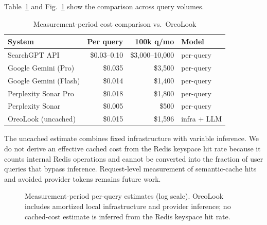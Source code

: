 \documentclass[conference]{IEEEtran}
\begin{document}
Table~\ref{tab:cost} and Fig.~\ref{fig:cost} show the comparison across query volumes.

\begin{table}[h]
\centering
\caption{Measurement-period cost comparison vs.\ OreoLook}
\label{tab:cost}
{\scriptsize
\begin{tabular}{@{}lrrl@{}}
\toprule
\textbf{System} & \textbf{Per query} & \textbf{100k q/mo} & \textbf{Model} \\
\midrule
SearchGPT API & \$0.03--0.10 & \$3{,}000--10{,}000 & per-query \\
Google Gemini (Pro) & \$0.035 & \$3{,}500 & per-query \\
Google Gemini (Flash) & \$0.014 & \$1{,}400 & per-query \\
Perplexity Sonar Pro & \$0.018 & \$1{,}800 & per-query \\
Perplexity Sonar & \$0.005 & \$500 & per-query \\
\midrule
OreoLook (uncached) & \$0.015 & \$1{,}596 & infra + LLM \\
\bottomrule
\end{tabular}}
\end{table}

The uncached estimate combines fixed infrastructure with variable inference. We do not derive an effective cached cost from the Redis keyspace hit rate because it counts internal Redis operations and cannot be converted into the fraction of user queries that bypass inference. Request-level measurement of semantic-cache hits and avoided provider tokens remains future work.

\begin{figure}[h]
\centering
{}
\caption{Measurement-period per-query estimates (log scale). OreoLook includes amortized local infrastructure and provider inference; no cached-cost estimate is inferred from the Redis keyspace hit rate.}
\label{fig:cost}
\end{figure}
\end{document}
